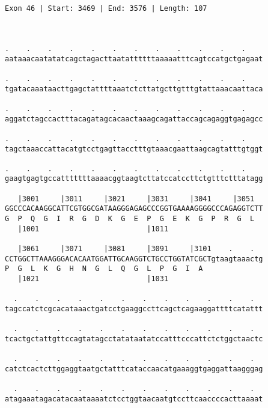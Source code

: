 \documentclass{article}
\begin{document}
\begin{Verbatim}
                                                      
 
Exon 46 | Start: 3469 | End: 3576 | Length: 107



.    .    .    .    .    .    .    .    .    .    .    .    
aataaacaatatatcagctagacttaatattttttaaaaatttcagtccatgctgagaat
                                                            
.    .    .    .    .    .    .    .    .    .    .    .    
tgatacaaataacttgagctattttaaatctcttatgcttgtttgtattaaacaattaca
                                                            
.    .    .    .    .    .    .    .    .    .    .    .    
aggatctagccactttacagatagcacaactaaagcagattaccagcagaggtgagagcc
                                                            
.    .    .    .    .    .    .    .    .    .    .    .    
tagctaaaccattacatgtcctgagttacctttgtaaacgaattaagcagtatttgtggt
                                                            
.    .    .    .    .    .    .    .    .    .    .    .    
gaagtgagtgccatttttttaaaacggtaagtcttatccatccttctgtttctttatagg
                                                            
   |3001     |3011     |3021     |3031     |3041     |3051  
GGCCCACAAGGCATTCGTGGCGATAAGGGAGAGCCCGGTGAAAAGGGGCCCAGAGGTCTT
G  P  Q  G  I  R  G  D  K  G  E  P  G  E  K  G  P  R  G  L  
   |1001                         |1011                      
  
   |3061     |3071     |3081     |3091     |3101    .    .  
CCTGGCTTAAAGGGACACAATGGATTGCAAGGTCTGCCTGGTATCGCTgtaagtaaactg
P  G  L  K  G  H  N  G  L  Q  G  L  P  G  I  A              
   |1021                         |1031                      
  
  .    .    .    .    .    .    .    .    .    .    .    .  
tagccatctcgcacataaactgatcctgaaggccttcagctcagaaggattttcatattt
                                                            
  .    .    .    .    .    .    .    .    .    .    .    .  
tcactgctattgttccagtatagcctatataatatccatttcccattctctggctaactc
                                                            
  .    .    .    .    .    .    .    .    .    .    .    .  
catctcactcttggaggtaatgctatttcataccaacatgaaaggtgaggattaagggag
                                                            
  .    .    .    .    .    .    .    .    .    .    .    .  
atagaaatagacatacaataaaatctcctggtaacaatgtccttcaaccccacttaaaat
                                                            

\end{Verbatim}
\end{document}
